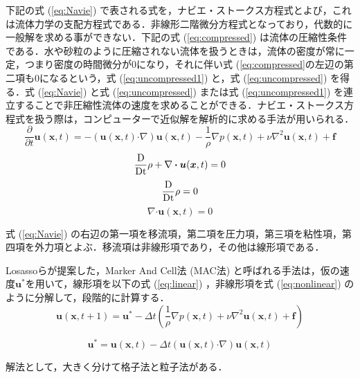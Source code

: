 \documentclass[a4j,12pt]{jreport}
\begin{document}
下記の式 (\ref{eq:Navie}) で表される式を，ナビエ・ストークス方程式とよび，これは流体力学の支配方程式である．非線形二階微分方程式となっており，代数的に一般解を求める事ができない．下記の式 (\ref{eq:compressed}) は流体の圧縮性条件である．水や砂粒のように圧縮されない流体を扱うときは，流体の密度が常に一定，つまり密度の時間微分が0になり，それに伴い式 (\ref{eq:compressed}の左辺の第二項も0になるという，式 (\ref{eq:uncompressed1}) と，式 (\ref{eq:uncompressed}) を得る．式 (\ref{eq:Navie}) と式 (\ref{eq:uncompressed}) または式 (\ref{eq:uncompressed1}) を連立することで非圧縮性流体の速度を求めることができる．ナビエ・ストークス方程式を扱う際は，コンピューターで近似解を解析的に求める手法が用いられる．
\begin{equation}\label{eq:Navie}
\frac{\partial}{\partial t}\bm{u} (\bm{x},t)  = - (\bm{u} (\bm{x},t)  \boldsymbol{\cdot}\nabla) \bm{u} (\bm{x},t)   - \frac{1}{\rho}\nabla p (\bm{x},t)  + \nu\nabla^2\bm{u} (\bm{x},t)  + \bm{f}
\end{equation}
\begin{equation}\label{eq:compressed}
\frac{\rm{D}}{\rm{Dt}}\rho + \nabla\boldsymbol{\cdot}\bm{u} (\bm{x},t)  = 0
\end{equation}
\begin{equation}\label{eq:uncompressed1}
\frac{\rm{D}}{\rm{Dt}}\rho  = 0
\end{equation}
\begin{equation}\label{eq:uncompressed}
\nabla\boldsymbol{\cdot}\bm{u} (\bm{x},t)  = 0
\end{equation}

式 (\ref{eq:Navie}) の右辺の第一項を移流項，第二項を圧力項，第三項を粘性項，第四項を外力項とよぶ．移流項は非線形項であり，その他は線形項である．

Losassoらが提案した，Marker And Cell法 (MAC法) \cite{MAC}と呼ばれる手法は，仮の速度$\bm{u}^*$を用いて，線形項を以下の式 (\ref{eq:linear}) ，非線形項を式 (\ref{eq:nonlinear}) のように分解して，段階的に計算する．
\begin{equation}\label{eq:linear}
\bm{u} (\bm{x},t+1)  =  \bm{u}^* - \varDelta t (\frac{1}{\rho}\nabla p (\bm{x},t)  + \nu\nabla^2\bm{u} (\bm{x},t)  + \bm{f}) 
\end{equation} 

\begin{equation}\label{eq:nonlinear}
\bm{u}^* = \bm{u} (\bm{x},t)  - \varDelta t (\bm{u} (\bm{x},t)  \boldsymbol{\cdot}\nabla) \bm{u} (\bm{x},t)  
\end{equation}

解法として，大きく分けて格子法と粒子法がある．
\end{document}
